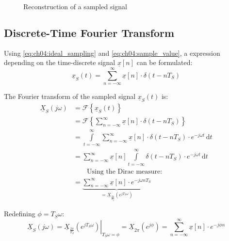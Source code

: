 \begin{refsection}
\begin{figure}[H]
	\caption{Reconstruction of a sampled signal}
\end{figure}

\subsection{Discrete-Time Fourier Transform}

Using \eqref{eq:ch04:ideal_sampling} and \eqref{eq:ch04:sample_value}, a expression depending on the time-discrete signal $\underline{x}[n]$ can be formulated:
\begin{equation}
	\underline{x}_S(t) = \sum\limits_{n = -\infty}^{\infty} \underline{x}[n] \cdot \delta(t - n T_S)
\end{equation}

The Fourier transform of the sampled signal $\underline{x}_S(t)$ is:
\begin{equation}
	\begin{split}
		\underline{X}_S \left(j \omega\right) &= \mathcal{F} \left\{\underline{x}_S(t)\right\} \\
		 &= \mathcal{F} \left\{\sum\limits_{n = -\infty}^{\infty} \underline{x}[n] \cdot \delta(t - n T_S)\right\} \\
		 &= \int\limits_{t = -\infty}^{\infty} \sum\limits_{n = -\infty}^{\infty} \underline{x}[n] \cdot \delta(t - n T_S) \cdot e^{-j \omega t} \, \mathrm{d} t \\
		 &= \sum\limits_{n = -\infty}^{\infty} \underline{x}[n] \int\limits_{t = -\infty}^{\infty} \delta(t - n T_S) \cdot e^{-j \omega t} \, \mathrm{d} t \\
		 &\qquad \text{Using the Dirac measure:} \\
		 &= \underbrace{\sum\limits_{n = -\infty}^{\infty} \underline{x}[n] \cdot e^{-j \omega n T_S}}_{= \underline{X}_{\frac{2\pi}{T_S}} \left(e^{j T_S \omega}\right)}
	\end{split}
	\label{eq:ch04:sampled_signal_spectrum}
\end{equation}

Redefining $\phi = T_S \omega$:
\begin{equation}
	\underline{X}_S \left(j \omega\right) = \left.\underline{X}_{\frac{2\pi}{T_S}} \left(e^{j T_S \omega}\right)\right|_{T_S \omega = \phi} = \underline{X}_{2 \pi} \left(e^{j \phi}\right) = \sum\limits_{n = -\infty}^{\infty} \underline{x}[n] \cdot e^{-j \phi n}
\end{equation}


\end{refsection}
